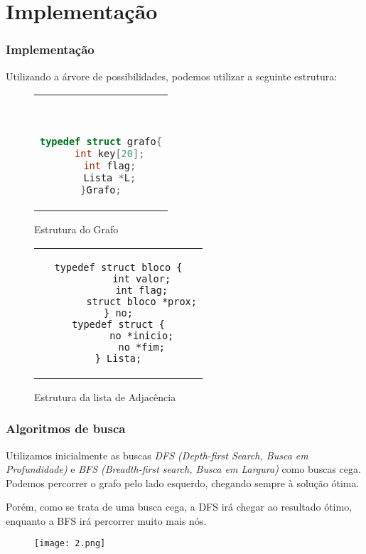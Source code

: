 \documentclass[10pt,portuguese,notheorems,compress]{beamer}
\begin{document}
\section{Implementação}
\begin{frame}[fragile]
\frametitle{Implementação}
Utilizando a árvore de possibilidades, podemos utilizar a seguinte estrutura:

\begin{minipage}[b]{0.5\textwidth}
\begin{figure}[thp] %
\centering          %
\begin{tabular}{c}
\
\begin{lstlisting}[tabsize=8,language=C++]
typedef struct grafo{
   int key[20];
   int flag;
   Lista *L;
}Grafo;
\end{lstlisting}
\end{tabular}
\caption*{Estrutura do Grafo}
\end{figure}
\end{minipage}%
\begin{minipage}[b]{0.5\textwidth}
\begin{figure}[thp] %
\centering          %
\begin{tabular}{c}
\begin{lstlisting}[tabsize=8,basicstyle=\ttfamily]
typedef struct bloco {
        int valor;
        int flag;
        struct bloco *prox;
} no;
typedef struct {
        no *inicio;
        no *fim;
} Lista;
\end{lstlisting}
\end{tabular}
\caption*{Estrutura da lista de Adjacência}
\end{figure}
\end{minipage}%
\end{frame}

\begin{frame}
\frametitle{Algoritmos de busca}
Utilizamos inicialmente as buscas \textit{DFS (Depth-first Search, Busca em Profundidade)} e \textit{BFS (Breadth-first search, Busca em Largura)} como buscas cega. Podemos percorrer o grafo pelo lado esquerdo, chegando sempre à solução ótima.

Porém, como se trata de uma busca cega, a DFS irá chegar ao resultado ótimo, enquanto a BFS irá percorrer muito mais nós.
\begin{figure}[H]
\texttt{[image: 2.png]}
\end{figure}
\end{frame}
\end{document}
